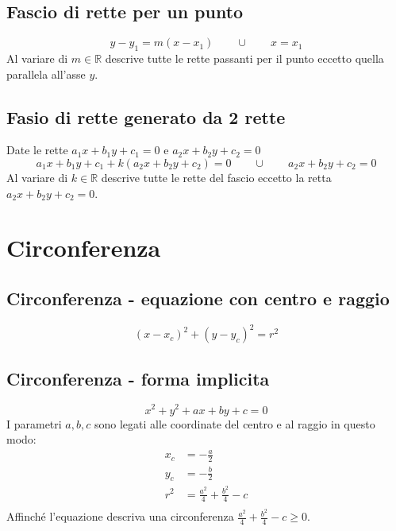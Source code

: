 \documentclass{article}
\begin{document}
  \subsection*{Fascio di rette per un punto}
  \begin{equation}
    y-y_1 = m(x-x_1) \qquad\cup\qquad x = x_1
  \end{equation}
  Al variare di $m \in \mathbb{R}$ descrive tutte le rette passanti per il punto eccetto quella parallela all'asse $y$.

  \subsection*{Fasio di rette generato da 2 rette}
  Date le rette $a_1x+b_1y+c_1 = 0$ e $a_2x+b_2y+c_2 = 0$
  \begin{equation}
    a_1x+b_1y+c_1 + k (a_2x+b_2y+c_2) = 0 \qquad\cup\qquad a_2x+b_2y+c_2 = 0
  \end{equation}
  Al variare di $k \in \mathbb{R}$ descrive tutte le rette del fascio eccetto la retta $a_2x+b_2y+c_2 = 0$.

  \newpage
  \section{Circonferenza}

  \subsection*{Circonferenza - equazione con centro e raggio}
  \begin{equation}
    (x-x_c)^2+(y-y_c)^2 = r^2
  \end{equation}

  \subsection*{Circonferenza - forma implicita}
  \begin{equation}
    x^2+y^2+ax+by+c = 0
  \end{equation}
  I parametri $a, b, c$ sono legati alle coordinate del centro e al raggio in questo modo: 
  \begin{align*}
    x_c &= -\frac{a}{2}\\
    y_c &= -\frac{b}{2}\\
    r^2 &= \frac{a^2}{4} + \frac{b^2}{4} - c \\
  \end{align*}
  Affinché l'equazione descriva una circonferenza $\frac{a^2}{4} + \frac{b^2}{4} - c \ge 0$.
\end{document}
